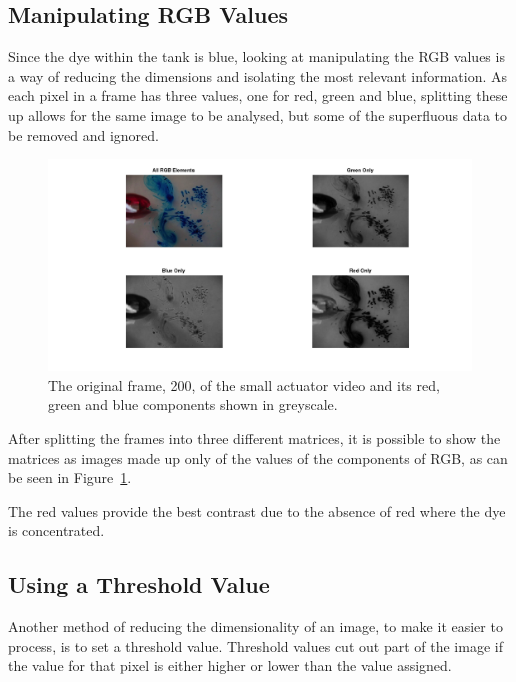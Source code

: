 \subsection{Manipulating RGB Values}
\label{sec:rgb}

Since the dye within the tank is blue, looking at manipulating the RGB values is a way of reducing the dimensions and isolating the most relevant information. As each pixel in a frame has three values, one for red, green and blue, splitting these up allows for the same image to be analysed, but some of the superfluous data to be removed and ignored. 


\begin{figure}[H]
	\centering
	\includegraphics[width=1\textwidth]{Pictures/rgbshow.png}
    \caption{The original frame, 200, of the small actuator video and its red, green and blue components shown in greyscale.}
    \label{fig:rgbshow}
\end{figure}


After splitting the frames into three different matrices, it is possible to show the matrices as images made up only of the values of the components of RGB, as can be seen in Figure~\ref{fig:rgbshow}.

The red values provide the best contrast due to the absence of red where the dye is concentrated.


\subsection{Using a Threshold Value}
\label{sec:threshold}

Another method of reducing the dimensionality of an image, to make it easier to process, is to set a threshold value. Threshold values cut out part of the image if the value for that pixel is either higher or lower than the value assigned. 

